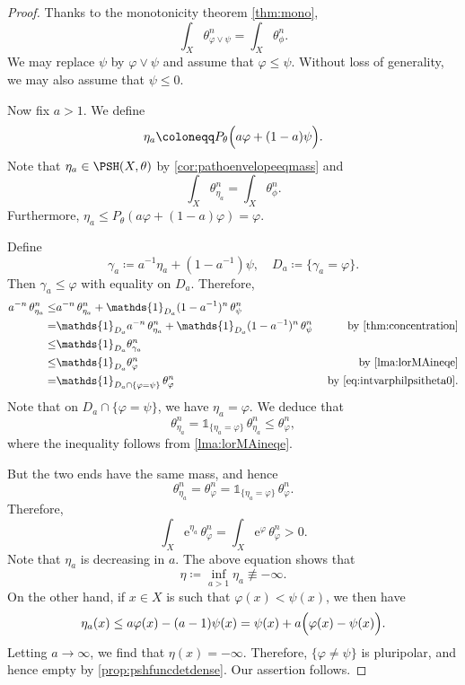 \begin{proof}
    Thanks to the monotonicity theorem \cref{thm:mono},
    \[
    \int_X \theta_{\varphi\lor\psi}^n=\int_X \theta_{\phi}^n.
    \]
    We may replace $\psi$ by $\varphi\lor\psi$ and assume that $\varphi\leq \psi$. Without loss of generality, we may also assume that $\psi\leq 0$.

    Now fix $a>1$. We define
    \[
    \eta_a\coloneqq P_{\theta}\Bigl( a\varphi+(1-a)\psi\Bigr).
    \]
    Note that $\eta_a\in \PSH(X,\theta)$ by \cref{cor:pathoenvelopeeqmass} and
    \[
    \int_X \theta_{\eta_a}^n=\int_X \theta_{\phi}^n.
    \]
    Furthermore, $\eta_a\leq P_{\theta}(a\varphi+(1-a)\varphi)=\varphi$.

    Define
    \[
    \gamma_a\coloneqq a^{-1}\eta_a+(1-a^{-1})\psi,\quad D_a\coloneqq \{\gamma_a=\varphi\}.
    \]
    Then $\gamma_a\leq \varphi$ with equality on $D_a$. Therefore,
    \[
    \begin{aligned}
    a^{-n}\,\theta_{\eta_a}^n\leq & a^{-n}\,\theta_{\eta_a}^n+\mathds{1}_{D_a} (1-a^{-1})^n \,\theta_{\psi}^n&\\
    =& \mathds{1}_{D_a} a^{-n}\,\theta_{\eta_a}^n+\mathds{1}_{D_a} (1-a^{-1})^n \,\theta_{\psi}^n & \textup{ by \cref{thm:concentration}}\\
    \leq & \mathds{1}_{D_a} \theta_{\gamma_a}^n &\\
    \leq & \mathds{1}_{D_a} \theta_{\varphi}^n & \textup{ by \cref{lma:lorMAineqe}}\\
    =& \mathds{1}_{D_a\cap \{\varphi=\psi\}}\, \theta_{\varphi}^n & \textup{ by \eqref{eq:intvarphilpsitheta0}}.
    \end{aligned}
    \]
    Note that on $D_a\cap \{\varphi=\psi\}$, we have $\eta_a=\varphi$.
    We deduce that
    \[
    \theta_{\eta_a}^n=\mathds{1}_{\{\eta_a=\varphi\}}\, \theta_{\eta_a}^n \leq \theta_{\varphi}^n,
    \]
    where the inequality follows from \cref{lma:lorMAineqe}.

    But the two ends have the same mass, and hence
    \[
    \theta_{\eta_a}^n=\theta_{\varphi}^n=\mathds{1}_{\{\eta_a=\varphi\}}\,\theta_{\varphi}^n.
    \]
    Therefore,
    \[
    \int_X \mathrm{e}^{\eta_a}\,\theta_{\varphi}^n=\int_X \mathrm{e}^{\varphi}\,\theta_{\varphi}^n>0.
    \]
    Note that $\eta_a$ is decreasing in $a$. The above equation shows that
    \[
    \eta\coloneqq\inf_{a>1} \eta_a\not\equiv -\infty.
    \]
    On the other hand, if $x\in X$ is such that $\varphi(x)<\psi(x)$, we then have
    \[
    \eta_a(x)\leq a\varphi(x)-(a-1)\psi(x)= \psi(x)+a\Bigl( \varphi(x)-\psi(x) \Bigr).
    \]
    Letting $a\to \infty$, we find that $\eta(x)=-\infty$. Therefore, $\{\varphi\neq \psi\}$ is pluripolar, and hence empty by \cref{prop:pshfuncdetdense}. Our assertion follows.
\end{proof}



